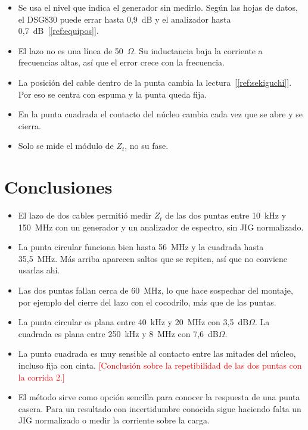 \documentclass[11pt,a4paper]{article}
\newcommand{\pendiente}[1]{\textcolor{red}{[#1]}}
\begin{document}
\begin{itemize}
  \item Se usa el nivel que indica el generador sin medirlo. Según las hojas de datos, el DSG830 puede errar hasta 0,9~dB y el analizador hasta 0,7~dB~[\ref{ref:equipos}].
  \item El lazo no es una línea de 50~$\Omega$. Su inductancia baja la corriente a frecuencias altas, así que el error crece con la frecuencia.
  \item La posición del cable dentro de la punta cambia la lectura~[\ref{ref:sekiguchi}]. Por eso se centra con espuma y la punta queda fija.
  \item En la punta cuadrada el contacto del núcleo cambia cada vez que se abre y se cierra.
  \item Solo se mide el módulo de $Z_t$, no su fase.
\end{itemize}

\section{Conclusiones}

\begin{itemize}
  \item El lazo de dos cables permitió medir $Z_t$ de las dos puntas entre 10~kHz y 150~MHz con un generador y un analizador de espectro, sin JIG normalizado.
  \item La punta circular funciona bien hasta 56~MHz y la cuadrada hasta 35,5~MHz. Más arriba aparecen saltos que se repiten, así que no conviene usarlas ahí.
  \item Las dos puntas fallan cerca de 60~MHz, lo que hace sospechar del montaje, por ejemplo del cierre del lazo con el cocodrilo, más que de las puntas.
  \item La punta circular es plana entre 40~kHz y 20~MHz con 3,5~dB$\Omega$. La cuadrada es plana entre 250~kHz y 8~MHz con 7,6~dB$\Omega$.
  \item La punta cuadrada es muy sensible al contacto entre las mitades del núcleo, incluso fija con cinta. \pendiente{Conclusión sobre la repetibilidad de las dos puntas con la corrida 2.}
  \item El método sirve como opción sencilla para conocer la respuesta de una punta casera. Para un resultado con incertidumbre conocida sigue haciendo falta un JIG normalizado o medir la corriente sobre la carga.
\end{itemize}
\end{document}
